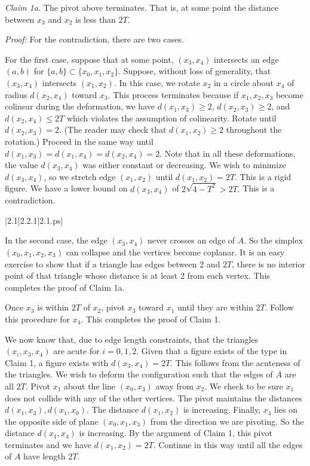 \smallskip

{\it Claim 1a.} The pivot above terminates.  That is, at some point the distance between 
$x_3$ and $x_2$ is less than $2T$.  

\smallskip

{\it Proof:} For the contradiction, there are two cases.  

For the first case, suppose that at some point, $(x_3,x_4)$ intersects an edge 
$(a,b)$ for $\{a,b\}\subset\{x_0,x_1,x_2\}$.  Suppose, without loss of generality, 
that $(x_3,x_4)$ intersects $(x_1,x_2)$.  
In this case, we rotate $x_2$ in a circle about $x_4$ of radius
$d(x_2,x_4)$ toward $x_3$.  This process terminates because if $x_1,x_2,x_3$ 
become colinear during the deformation, we have  $d(x_1,x_3)\ge2$, $d(x_2,x_3)\ge2$,
and $d(x_2,x_4)\le2T$ which violates the assumption of colinearity.
Rotate until  $d(x_2,x_3)=2$.  
(The reader may check that $d(x_1,x_2)\ge2$ throughout the rotation.)
Proceed in the same way until $d(x_1,x_3)=
d(x_1,x_4)=d(x_2,x_4)=2$.  Note that in all these deformations, the
value $d(x_3,x_4)$ was either constant or decreasing.  We wish to minimize $d(x_3,x_4)$, so 
we stretch edge $(x_1,x_2)$ until $d(x_1,x_2)=2T$.  This is a rigid figure.
We have a lower bound on $d(x_3,x_4)$ of $2\sqrt{4-T^2}>2T.$  This is a
contradiction.


\gram|2.1|2.2.1|2.1.ps|  %


In the second case, the edge $(x_3,x_4)$ never crosses an edge of $A$.
So the simplex $(x_0,x_1,x_2,x_3)$ can collapse and the vertices become
 coplanar.  It is an easy exercise to show that if
a triangle has edges between 2 and $2T$, there is no interior point of that triangle whose distance is at least 2 from each vertex.
 This completes the proof of Claim 1a.

Once $x_3$ is within $2T$ of $x_2$, pivot $x_3$ toward $x_1$ until they are 
within $2T$.  Follow this procedure for $x_4$.  
This completes the proof of Claim 1.

\smallskip

We now know that, due to edge length constraints, that the triangles $(x_i,x_3,x_4)$ are acute for 
$i=0,1,2$. Given that a figure exists of the type in Claim 1, 
a figure exists with $d(x_3,x_4)=2T$.  This follows from the acuteness of 
the triangles.  We wish to deform the configuration such that 
the edges of $A$ are all $2T$.  Pivot $x_1$ about the line $(x_0,x_3)$ away from $x_2$.  
We check to be sure $x_1$ does not collide with any of the other vertices. 
The pivot maintains the distances $d(x_1,x_3),d(x_1,x_0)$.  
The distance $d(x_1,x_2)$ is increasing.  Finally, $x_4$ lies on the opposite side of 
plane $(x_0,x_1,x_3)$ from the direction we are pivoting.  So the distance 
$d(x_1,x_4)$ is increasing.   By the argument of Claim 1, 
this pivot terminates and we have $d(x_1,x_2)=2T$.  
Continue in this way until all the edges of $A$ have length $2T$.  

